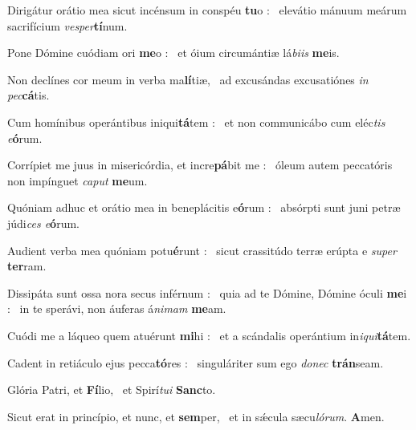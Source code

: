 \documentclass[12pt]{article} %
\def\noinitial{%
\gresetfirstlineaboveinitial{\textcolor{benred8}{\small \textsc{\textbf{}}}}{\textcolor{benred8}{\small \textsc{\textbf{}}}}
\setspaceafterinitial{0pt plus 0em minus 0em}%
\setspacebeforeinitial{0pt plus 0em minus 0em}%
\relax %
}
\newenvironment{psalmtext}{\leftskip 0.25in}{\vspace{1 mm}}
\let\oldgresixstar\gresixstar
\renewcommand{\gresixstar}{\textcolor{benred8}{\oldgresixstar}}
\let\oldgredagger\gredagger
\renewcommand{\gredagger}{\textcolor{benred8}{\oldgredagger}}
\begin{document}
\begin{psalmtext}
Dirigátur orátio mea sicut incénsum in conspéu \textbf{tu}o : \gresixstar\ elevátio mánuum meárum sacrifícium \emph{vesper}\textbf{tí}num.

Pone Dómine cuódiam ori \textbf{me}o : \gresixstar\ et óium circumántiæ lá\emph{biis} \textbf{me}is.

Non declínes cor meum in verba ma\textbf{lí}tiæ, \gresixstar\ ad excusándas excusatiónes \emph{in pec}\textbf{cá}tis.

Cum homínibus operántibus iniqui\textbf{tá}tem : \gresixstar\ et non communicábo cum eléc\emph{tis e}\textbf{ó}rum.

Corrípiet me juus in misericórdia, et incre\textbf{pá}bit me : \gresixstar\ óleum autem peccatóris non impínguet \emph{caput} \textbf{me}um.

Quóniam adhuc et orátio mea in beneplácitis e\textbf{ó}rum : \gresixstar\ absórpti sunt juni petræ júdi\emph{ces e}\textbf{ó}rum.

Audient verba mea quóniam potu\textbf{é}runt : \gresixstar\ sicut crassitúdo terræ erúpta e \emph{super} \textbf{ter}ram.

Dissipáta sunt ossa nora secus inférnum : \gredagger\ quia ad te Dómine, Dómine óculi \textbf{me}i : \gresixstar\ in te sperávi, non áuferas á\emph{nimam} \textbf{me}am.

Cuódi me a láqueo quem atuérunt \textbf{mi}hi : \gresixstar\ et a scándalis operántium in\emph{iqui}\textbf{tá}tem.

Cadent in retiáculo ejus pecca\textbf{tó}res : \gresixstar\ singuláriter sum ego \emph{donec} \textbf{trán}seam.

Glória Patri, et \textbf{Fí}lio, \gresixstar\ et Spirí\emph{tui} \textbf{Sanc}to.

Sicut erat in princípio, et nunc, et \textbf{sem}per, \gresixstar\ et in sǽcula sæcu\emph{lórum}. \textbf{A}men.

\end{psalmtext}

{\noinitial
{}

}

\vspace{2 mm}


\subsection*{}
\end{document}
